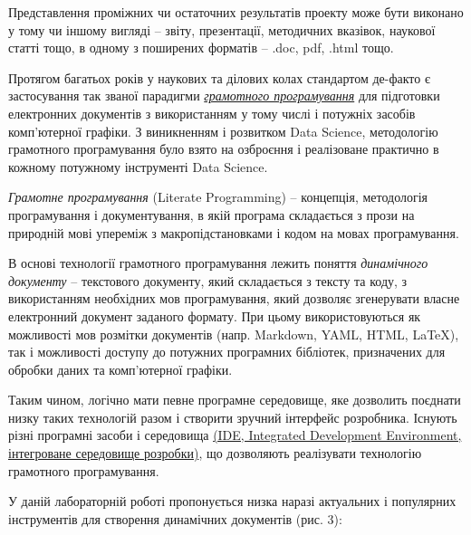 \documentclass[
]{book}
\begin{document}
Представлення проміжних чи остаточних результатів проекту може бути виконано у тому чи іншому вигляді -- звіту, презентації, методичних вказівок, наукової статті тощо, в одному з поширених форматів -- .doc, pdf, .html тощо.

Протягом багатьох років у наукових та ділових колах стандартом де-факто є застосування так званої парадигми \href{https://en.wikipedia.org/wiki/Literate_programming}{\emph{грамотного програмування}} для підготовки електронних документів з використанням у тому числі і потужніх засобів комп'ютерної графіки. З виникненням і розвитком Data Science, методологію грамотного програмування було взято на озброєння і реалізоване практично в кожному потужному інструменті Data Science.

\emph{Грамотне програмування} (Literate Programming) -- концепція, методологія програмування і документування, в якій програма складається з прози на природній мові упереміж з макропідстановками і кодом на мовах програмування.

В основі технології грамотного програмування лежить поняття \emph{динамічного документу} -- текстового документу, який складається з тексту та коду, з використанням необхідних мов програмування, який дозволяє згенерувати власне електронний документ заданого формату. При цьому використовуються як можливості мов розмітки документів (напр. Markdown, YAML, HTML, LaTeX), так і можливості доступу до потужних програмних бібліотек, призначених для обробки даних та комп'ютерної графіки.

Таким чином, логічно мати певне програмне середовище, яке дозволить поєднати низку таких технологій разом і створити зручний інтерфейс розробника. Існують різні програмні засоби і середовища \href{https://uk.wikipedia.org/wiki/\%D0\%86\%D0\%BD\%D1\%82\%D0\%B5\%D0\%B3\%D1\%80\%D0\%BE\%D0\%B2\%D0\%B0\%D0\%BD\%D0\%B5_\%D1\%81\%D0\%B5\%D1\%80\%D0\%B5\%D0\%B4\%D0\%BE\%D0\%B2\%D0\%B8\%D1\%89\%D0\%B5_\%D1\%80\%D0\%BE\%D0\%B7\%D1\%80\%D0\%BE\%D0\%B1\%D0\%BA\%D0\%B8}{(IDE, Integrated Development Environment, інтегроване середовище розробки)}, що дозволяють реалізувати технологію грамотного програмування.

У даній лабораторній роботі пропонується низка наразі актуальних і популярних інструментів для створення динамічних документів (рис. 3):
\end{document}
